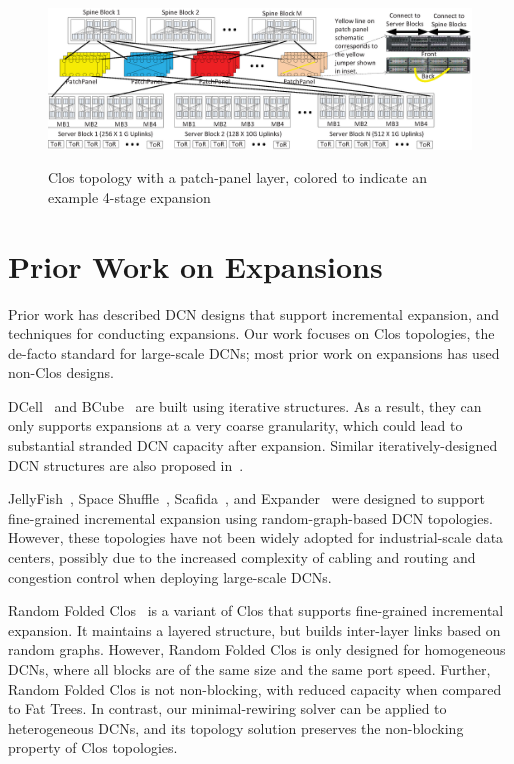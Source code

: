 \documentclass[letterpaper,twocolumn,10pt]{article}
\begin{document}
\begin{figure}
  \centering
  \includegraphics[scale=0.55]{topology}\\
\vspace{-1ex}
  \caption{Clos topology with a patch-panel layer, colored to indicate an example 4-stage expansion}
\label{topology}
\end{figure}
\section{Prior Work on Expansions}

Prior work has described DCN designs that support incremental expansion, and techniques for conducting expansions. Our work focuses on Clos topologies, the de-facto standard for large-scale DCNs; most prior work on expansions has used non-Clos designs.

DCell~\cite{Dcell} and BCube~\cite{BCube} are built using iterative structures. As a result, they can only supports expansions at a very coarse granularity, which could lead to substantial stranded DCN capacity after expansion. Similar iteratively-designed DCN structures are also proposed in~\cite{ExpandableDcn2,FiConn,ExpandableDcn}.

JellyFish~\cite{Jellyfish}, Space Shuffle~\cite{SpaceShuffle}, Scafida~\cite{FreeScalingDcn}, and Expander~\cite{Xpander, ExpandingXpander} were designed to support fine-grained incremental expansion using random-graph-based DCN topologies. However, these topologies have not been widely adopted for industrial-scale data centers, possibly due to the increased complexity of cabling and routing and congestion control when deploying large-scale DCNs.

Random Folded Clos~\cite{RandomClos} is a variant of Clos that supports fine-grained incremental expansion. It maintains a layered structure, but builds inter-layer links based on random graphs. However, Random Folded Clos is only designed for homogeneous DCNs, where all blocks are of the same size and the same port speed. Further, Random Folded Clos is not non-blocking, with reduced capacity when compared to Fat Trees. In contrast, our minimal-rewiring solver can be applied to heterogeneous DCNs, and its topology solution preserves the non-blocking property of Clos topologies.
\end{document}
